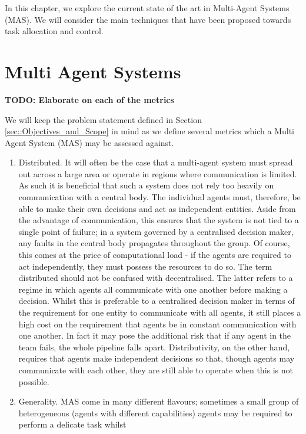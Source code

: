 \documentclass[.../main.tex]{subfiles}
\begin{document}
In this chapter, we explore the current state of the art in Multi-Agent Systems (MAS). We will
consider the main techniques that have been proposed towards task allocation and control. 

\section{Multi Agent Systems} \label{sec::Multi_Agent_Systems}

\textbf{TODO: Elaborate on each of the metrics}

We will keep the problem statement defined in Section \ref{sec::Objectives_and_Scope} in mind as
we define several metrics which a Multi Agent System (MAS) may be assessed against.

\begin{enumerate}
    \item Distributed. It will often be the case that a multi-agent system must spread out across a
    large area or operate in regions where communication is limited. As such it is beneficial that
    such a system does not rely too heavily on communication with a central body. The individual
    agents must, therefore, be able to make their own decisions and act as independent entities.
    Aside from the advantage of communication, this ensures that the system is not tied to a single
    point of failure; in a system governed by a centralised decision maker, any faults in the
    central body propagates throughout the group. Of course, this comes at the price of
    computational load - if the agents are required to act independently, they must possess the
    resources to do so. The term distributed should not be confused with decentralised. The latter
    refers to a regime in which agents all communicate with one another before making a decision.
    Whilst this is preferable to a centralised decision maker in terms of the requirement for one
    entity to communicate with all agents, it still places a high cost on the requirement that
    agents be in constant communication with one another. In fact it may pose the additional risk
    that if any agent in the team fails, the whole pipeline falls apart. Distributivity, on the
    other hand, requires that agents make independent decisions so that, though agents may
    communicate with each other, they are still able to operate when this is not possible.
    \item Generality. MAS come in many different flavours; sometimes a small group of heterogeneous 
    (agents with different capabilities) agents may be required to perform a delicate task whilst

\end{enumerate}
\end{document}

